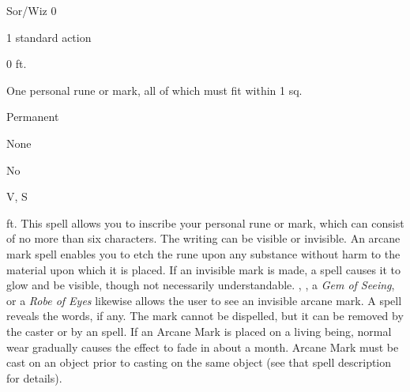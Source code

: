 
\begin{description*}
\item[Level:] Sor/Wiz 0
\item[Casting Time:] 1 standard action
\item[Range:] 0 ft.
\item[Effect:] One personal rune or mark, all of which must fit within 1 sq.
\item[Duration:] Permanent
\item[Saving Throw:] None
\item[Spell Resistance:] No
\item[Components:] V, S
\end{description*}

ft.
This spell allows you to inscribe your personal rune or mark, which can consist
of no more than six characters. The writing can be visible or invisible. An arcane
mark spell enables you to etch the rune upon any substance without harm to the
material upon which it is placed. If an invisible mark is made, a  spell causes it to glow and be visible, though not necessarily understandable.
, , a \textit{Gem of Seeing}, or a \textit{Robe of Eyes} likewise allows the user to see an invisible arcane mark. A  spell reveals the words, if any. The mark cannot be dispelled, but it can
be removed by the caster or by an  spell.
If an Arcane Mark is placed on a living being, normal wear gradually causes
the effect to fade in about a month.
Arcane Mark must be cast on an object prior to casting  on the same object (see that spell description for details).